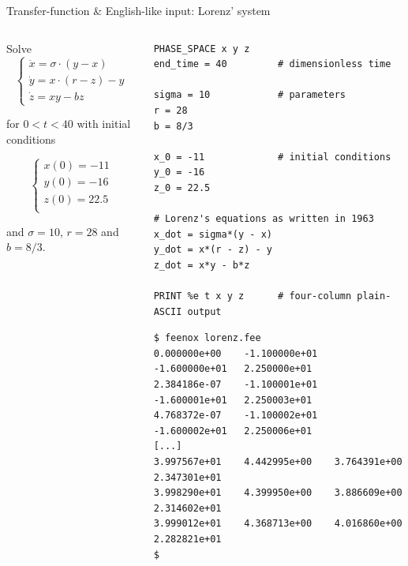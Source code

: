 \documentclass[
  ignorenonframetext,
  aspectratio=169,
]{beamer}
\begin{document}
\begin{frame}[fragile]{Transfer-function \& English-like input: Lorenz'
system}
\protect\hypertarget{transfer-function-english-like-input-lorenz-system}{}
\begin{columns}[T]
\begin{column}{0.45\textwidth}
Solve \[
\begin{cases}
\dot{x} = \sigma \cdot (y - x) \\
\dot{y} = x \cdot (r - z) - y \\
\dot{z} = x y - b z
\end{cases}
\]

\noindent for \(0 < t < 40\) with initial conditions

\[
\begin{cases}
x(0) = -11\\
y(0) = -16\\
z(0) = 22.5\\
\end{cases}
\]

\noindent and \(\sigma=10\), \(r=28\) and \(b=8/3\).
\end{column}

\pause

\begin{column}{0.55\textwidth}
\begin{lstlisting}[style=feenox]
PHASE_SPACE x y z
end_time = 40         # dimensionless time

sigma = 10            # parameters
r = 28
b = 8/3

x_0 = -11             # initial conditions
y_0 = -16
z_0 = 22.5

# Lorenz's equations as written in 1963
x_dot = sigma*(y - x)
y_dot = x*(r - z) - y
z_dot = x*y - b*z

PRINT %e t x y z      # four-column plain-ASCII output
\end{lstlisting}

\begin{lstlisting}[style=terminal]
$ feenox lorenz.fee
0.000000e+00    -1.100000e+01   -1.600000e+01   2.250000e+01
2.384186e-07    -1.100001e+01   -1.600001e+01   2.250003e+01
4.768372e-07    -1.100002e+01   -1.600002e+01   2.250006e+01
[...]
3.997567e+01    4.442995e+00    3.764391e+00    2.347301e+01
3.998290e+01    4.399950e+00    3.886609e+00    2.314602e+01
3.999012e+01    4.368713e+00    4.016860e+00    2.282821e+01
$
\end{lstlisting}
\end{column}
\end{columns}
\end{frame}
\end{document}
